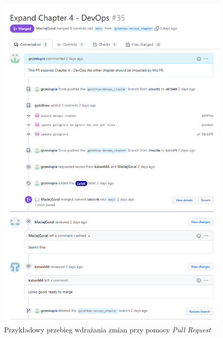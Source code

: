 \begin{figure}[H]
\centering\includegraphics[width=\textwidth]{figures/github_pr}
\caption{Przykładowy przebieg wdrażania zmian przy pomocy \textit{Pull Request}}\label{rys:github}
\end{figure}
	
	 
